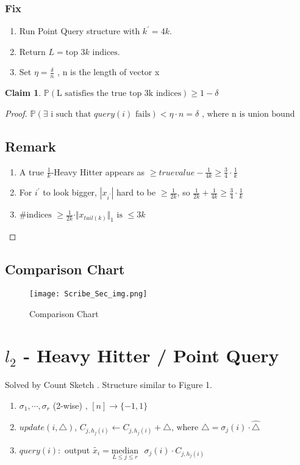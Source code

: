 \documentclass[11pt]{article}
\newtheorem{claim}[theorem]{Claim}
\begin{document}
\subsubsection*{Fix} 

\begin{enumerate}
\item Run Point Query structure with $k^\prime = 4k$.
\item Return $L = \text{top } 3k \text{ indices}$.
\item Set $\eta = \frac{\delta}{n}$ , n is the length of vector x
\end{enumerate}

\begin{claim}
$\mathbb{P}(\text{L satisfies the true top 3k indices}) \geq 1 - \delta$
\end{claim}

\begin{proof}
$\mathbb{P}(\exists \text{ i such that } query(i) \text{ fails}) < \eta \cdot n = \delta \text{ , where n is union bound}$

\subsection*{Remark}
\begin{enumerate}
    \item A true $\frac{1}{k}$-Heavy Hitter appears as $\geq true value - \frac{1}{4k} \geq \frac{3}{4} \cdot \frac{1}{k}$
    \item For $i^\prime$ to look bigger, $|x_{i^\prime}|$ hard to be $\geq \frac{1}{2k}$, so $\frac{1}{2k} + \frac{1}{4k} \geq \frac{3}{4} \cdot \frac{1}{k}$
    \item $\text{\# indices }\geq \frac{1}{2k} \cdot \Vert x_{tail(k)}\Vert_1 \text{ is } \leq 3k$
\end{enumerate}

\end{proof}

\subsection*{Comparison Chart}
\begin{figure}[h]
  \texttt{[image: Scribe\_Sec\_img.png]}
  \caption{Comparison Chart}
  \label{fig:Comparison Chart}
\end{figure}


\section{$l_2$ - Heavy Hitter / Point Query}
Solved by Count Sketch \cite{CCF02}. Structure similar to Figure 1.
\begin{enumerate}
    \item $\sigma_1 , \cdots  , \sigma_r$ (2-wise) , $[n]\rightarrow \{-1,1\}$
    \item $update(i,\triangle)$, $C_{j, h_j(i)}\leftarrow C_{j, h_j(i)}+\triangle \text{, where } \triangle = \sigma_j(i) \cdot \hat{\triangle}$ 
    \item $query(i):$ output $\tilde{x_i} = \underset{L\leq j\leq r}{\mathrm{median}} \text{ } \sigma_j(i) \cdot C_{j, h_j(i)}$
\end{enumerate}
\end{document}
